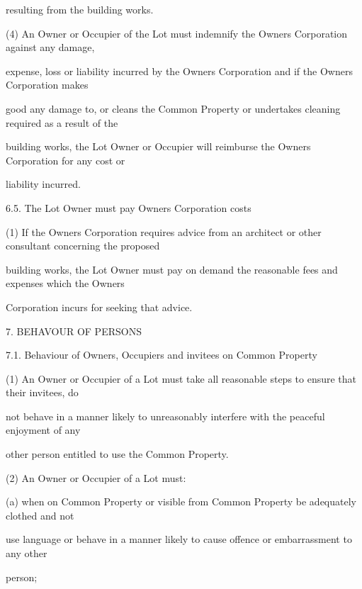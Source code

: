 \documentclass{article}
\begin{document}
{\fontsize{10.02}{1}resulting from the building works. }

{\fontsize{9.962}{1}(4) An Owner or Occupier of the Lot must indemnify the Owners Corporation against any damage, }

{\fontsize{10.02}{1}expense, loss or liability incurred by the Owners Corporation and if the Owners Corporation makes }

{\fontsize{10.02}{1}good any damage to, or cleans the Common Property or undertakes cleaning required as a result of the }

{\fontsize{10.02}{1}building works, the Lot Owner or Occupier will reimburse the Owners Corporation for any cost or }

{\fontsize{10.02}{1}liability incurred. }

{\fontsize{9.99}{1}6.5. The Lot Owner must pay Owners Corporation costs }

{\fontsize{9.962}{1}(1) If the Owners Corporation requires advice from an architect or other consultant concerning the proposed }

{\fontsize{10.02}{1}building works, the Lot Owner must pay on demand the reasonable fees and expenses which the Owners }

{\fontsize{10.02}{1}Corporation incurs for seeking that advice. }


{\fontsize{9.99}{1}7. BEHAVOUR OF PERSONS }

{\fontsize{9.99}{1}7.1. Behaviour of Owners, Occupiers and invitees on Common Property }

{\fontsize{9.962}{1}(1) An Owner or Occupier of a Lot must take all reasonable steps to ensure that their invitees, do }

{\fontsize{10.02}{1}not behave in a manner likely to unreasonably interfere with the peaceful enjoyment of any }

{\fontsize{10.02}{1}other person entitled to use the Common Property. }

{\fontsize{9.962}{1}(2) An Owner or Occupier of a Lot must: }

{\fontsize{9.962}{1}(a) when on Common Property or visible from Common Property be adequately clothed and not }

{\fontsize{10.02}{1}use language or behave in a manner likely to cause offence or embarrassment to any other }

{\fontsize{10.02}{1}person; }

\newpage
\end{document}
